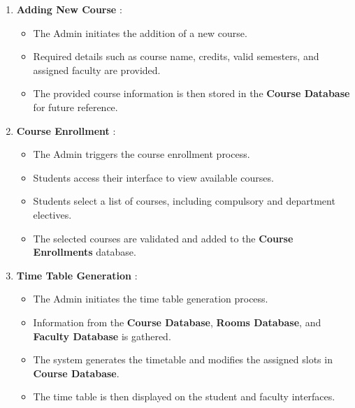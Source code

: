 \documentclass[12pt,a4paper]{article}
\begin{document}
\begin{enumerate}
	\item \textbf{Adding New Course} : 
		\begin{itemize}
			\item The Admin initiates the addition of a new course.
			\item Required details such as course name, credits, valid semesters, and assigned faculty are provided.
			\item The provided course information is then stored in the \textbf{Course Database} for future reference.
		\end{itemize}
	\item \textbf{Course Enrollment} :
		\begin{itemize}
			\item The Admin triggers the course enrollment process.
			\item Students access their interface to view available courses.
			\item Students select a list of courses, including compulsory and department electives.
			\item The selected courses are validated and added to the \textbf{Course Enrollments} database.
		\end{itemize}
	\item \textbf{Time Table Generation} :
		\begin{itemize}
			\item The Admin initiates the time table generation process.
			\item Information from the \textbf{Course Database}, \textbf{Rooms Database}, and \textbf{Faculty Database} is gathered.
			\item The system generates the timetable and modifies the assigned slots in \textbf{Course Database}.
			\item The time table is then displayed on the student and faculty interfaces.
		\end{itemize}
	
\end{enumerate}
\end{document}
